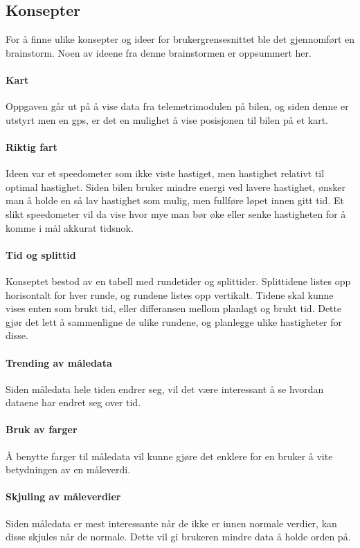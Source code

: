 \subsection{Konsepter}
For å finne ulike konsepter og ideer for brukergrensesnittet ble det gjennomført en brainstorm.
Noen av ideene fra denne brainstormen er oppsummert her.

\paragraph{Kart}
Oppgaven går ut på å vise data fra telemetrimodulen på bilen, og siden denne er utstyrt men en gps, er det en mulighet å vise posisjonen til bilen på et kart.

\paragraph{Riktig fart}
Ideen var et speedometer som ikke viste hastiget, men hastighet relativt til optimal hastighet. 
Siden bilen bruker mindre energi ved lavere hastighet, ønsker man å holde en så lav hastighet som mulig, men fullføre løpet innen gitt tid.
Et slikt speedometer vil da vise hvor mye man bør øke eller senke hastigheten for å komme i mål akkurat tidsnok.

\paragraph{Tid og splittid}
Konseptet bestod av en tabell med rundetider og splittider.
Splittidene listes opp horisontalt for hver runde, og rundene listes opp vertikalt.
Tidene skal kunne vises enten som brukt tid, eller differansen mellom planlagt og brukt tid.
Dette gjør det lett å sammenligne de ulike rundene, og planlegge ulike hastigheter for disse.

\paragraph{Trending av måledata}
Siden måledata hele tiden endrer seg, vil det være interessant å se hvordan dataene har endret seg over tid.

\paragraph{Bruk av farger}
Å benytte farger til måledata vil kunne gjøre det enklere for en bruker å vite betydningen av en måleverdi.

\paragraph{Skjuling av måleverdier}
Siden måledata er mest interessante når de ikke er innen normale verdier, kan disse skjules når de normale.
Dette vil gi brukeren mindre data å holde orden på.

